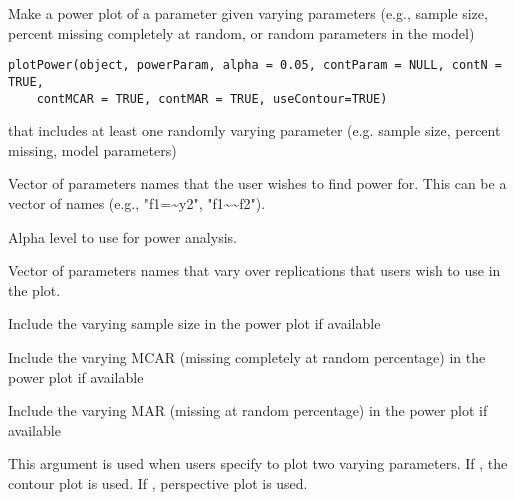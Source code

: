 \documentclass[a4paper]{book}
\begin{document}
%
\begin{Description}\relax
Make a power plot of a parameter given varying parameters (e.g., sample size, percent missing completely at random, or random parameters in the model)
\end{Description}
%
\begin{Usage}
\begin{verbatim}
plotPower(object, powerParam, alpha = 0.05, contParam = NULL, contN = TRUE, 
	contMCAR = TRUE, contMAR = TRUE, useContour=TRUE)
\end{verbatim}
\end{Usage}
%
\begin{Arguments}
\begin{ldescription}
\item[\code{object}] 
 that includes at least one randomly varying parameter (e.g. sample size, percent missing, model parameters)

\item[\code{powerParam}] 
Vector of parameters names that the user wishes to find power for. This can be a vector of names (e.g., "f1=\textasciitilde{}y2", "f1\textasciitilde{}\textasciitilde{}f2").

\item[\code{alpha}] 
Alpha level to use for power analysis.

\item[\code{contParam}] 
Vector of parameters names that vary over replications that users wish to use in the plot.

\item[\code{contN}] 
Include the varying sample size in the power plot if available

\item[\code{contMCAR}] 
Include the varying MCAR (missing completely at random percentage) in the power plot if available

\item[\code{contMAR}] 
Include the varying MAR (missing at random percentage) in the power plot if available

\item[\code{useContour}] 
This argument is used when users specify to plot two varying parameters. If , the contour plot is used. If , perspective plot is used.

\end{ldescription}
\end{Arguments}
\end{document}
